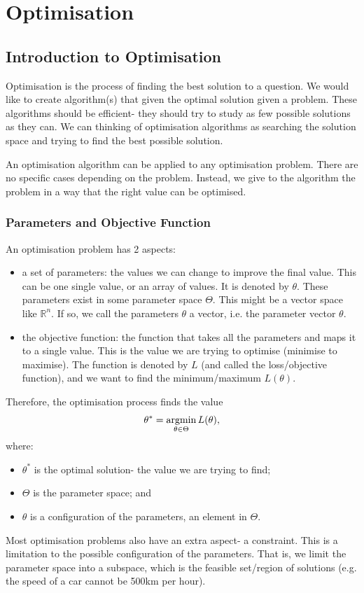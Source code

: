 \documentclass[a4paper, openany]{memoir}
\begin{document}
\chapter{Optimisation}
\section{Introduction to Optimisation}
Optimisation is the process of finding the best solution to a question. We would like to create algorithm(s) that given the optimal solution given a problem. These algorithms should be efficient- they should try to study as few possible solutions as they can. We can thinking of optimisation algorithms as searching the solution space and trying to find the best possible solution.

An optimisation algorithm can be applied to any optimisation problem. There are no specific cases depending on the problem. Instead, we give to the algorithm the problem in a way that the right value can be optimised.

\subsection{Parameters and Objective Function}
An optimisation problem has 2 aspects:
\begin{itemize}
    \item a set of parameters: the values we can change to improve the final value. This can be one single value, or an array of values. It is denoted by $\theta$. These parameters exist in some parameter space $\Theta$. This might be a vector space like $\mathbb{R}^n$. If so, we call the parameters $\theta$ a vector, i.e. the parameter vector $\theta$.
    \item the objective function: the function that takes all the parameters and maps it to a single value. This is the value we are trying to optimise (minimise to maximise). The function is denoted by $L$ (and called the loss/objective function), and we want to find the minimum/maximum $L(\theta)$.
\end{itemize}

Therefore, the optimisation process finds the value
\[\theta^* = \operatornamewithlimits{arg min}_{\theta \in \Theta} L(\theta),\]
where:
\begin{itemize}
    \item $\theta^*$ is the optimal solution- the value we are trying to find;
    \item $\Theta$ is the parameter space; and
    \item $\theta$ is a configuration of the parameters, an element in $\Theta$.
\end{itemize}
Most optimisation problems also have an extra aspect- a constraint. This is a limitation to the possible configuration of the parameters. That is, we limit the parameter space into a subspace, which is the feasible set/region of solutions (e.g. the speed of a car cannot be 500km per hour).
\end{document}
